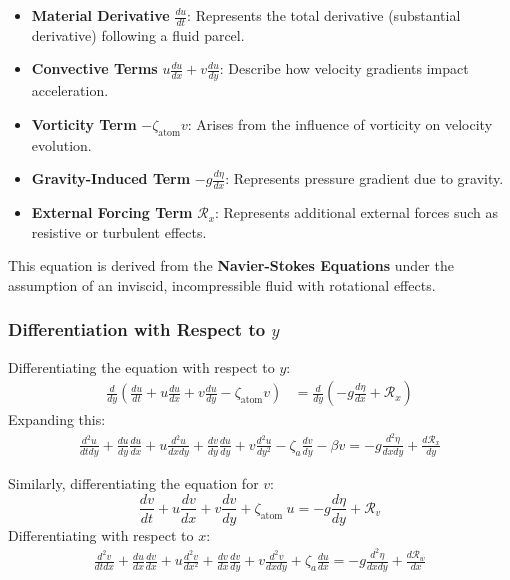 \documentclass[a4paper,10pt]{article}
\begin{document}
    \begin{itemize}
        \item \textbf{Material Derivative} $\frac{d u}{d t}$: Represents the total derivative (substantial derivative) following a fluid parcel.
        \item \textbf{Convective Terms} $u \frac{d u}{dx} + v \frac{d u}{dy}$: Describe how velocity gradients impact acceleration.
        \item \textbf{Vorticity Term} $-\zeta_\text{atom} v$: Arises from the influence of vorticity on velocity evolution.
        \item \textbf{Gravity-Induced Term} $-g \frac{d \eta}{d x}$: Represents pressure gradient due to gravity.
        \item \textbf{External Forcing Term} $\mathcal{R}_x$: Represents additional external forces such as resistive or turbulent effects.
    \end{itemize}

    This equation is derived from the \textbf{Navier-Stokes Equations} under the assumption of an inviscid, incompressible fluid with rotational effects.

    \subsubsection*{Differentiation with Respect to $y$}
    Differentiating the equation with respect to $y$:
    \begin{align}
        \frac{d}{dy} \left( \frac{d u}{d t} + u \frac{d u}{d x} + v \frac{d u}{d y} - \zeta_\text{atom} v \right) &= \frac{d}{dy} \left( - g \frac{d \eta}{d x} + \mathcal{R}_x \right)
    \end{align}
    Expanding this:
    \begin{align}
        \frac{d^2 u}{d t d y}+\frac{d u}{d y} \frac{d u}{d x}+u \frac{d^2 u}{d x d y}+\frac{d v}{d y} \frac{d u}{d y}+v \frac{d^2 u}{d y^2}-\zeta_a \frac{d v}{d y}-\beta v=-g \frac{d^2 \eta}{d x d y}+\frac{d \mathcal{R}_x}{d y}
    \end{align}

    Similarly, differentiating the equation for $v$:
    \begin{equation*}
        \frac{d v}{d t}+u \frac{d v}{d x}+v \frac{d v}{d y}+\zeta_{\text {atom }} u=-g \frac{d \eta}{d y}+\mathcal{R}_v
    \end{equation*}
    Differentiating with respect to $x$:
    \begin{align}
        \frac{d^2 v}{d t d x}+\frac{d u}{d x} \frac{d v}{d x}+u \frac{d^2 v}{d x^2}+\frac{d v}{d x} \frac{d v}{d y}+v \frac{d^2 v}{d x d y}+\zeta_a \frac{d u}{d x}=-g \frac{d^2 \eta}{d x d y}+\frac{d \mathcal{R}_w}{d x}
    \end{align}
\end{document}
